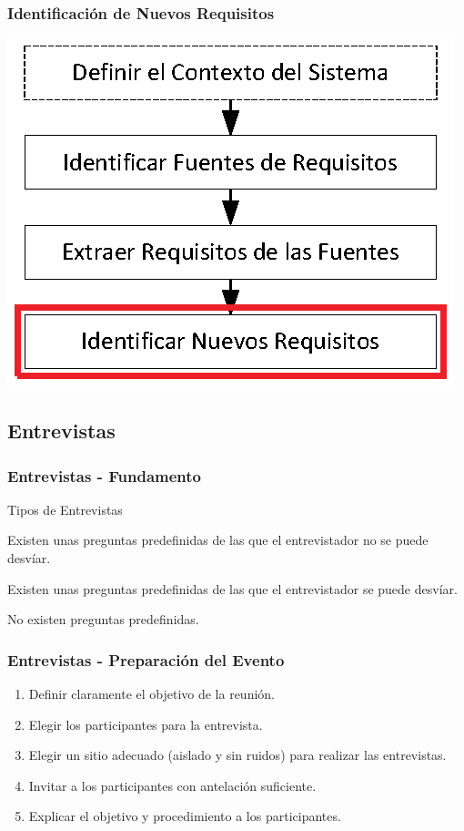 \documentclass[a4paper,t,xcolor=pst,dvips,blue]{beamer}
\begin{document}
\begin{frame}[c]
	\frametitle{Identificación de Nuevos Requisitos}
	\begin{center}
		\includegraphics[width=0.75\linewidth]{images/proceso/requisitosNuevos.eps}
	\end{center}
\end{frame}

\subsection{Entrevistas}

\begin{frame}[t]
    \frametitle{Entrevistas - Fundamento}
    \begin{block}{Tipos de Entrevistas}
        \begin{description}[<+->]
            \item[Estandarizada] Existen unas preguntas predefinidas de las que el entrevistador no se puede desvíar.
            \item[Exploratoria] Existen unas preguntas predefinidas de las que el entrevistador se puede desvíar.
            \item[No estructurada] No existen preguntas predefinidas.
        \end{description}
    \end{block}
\end{frame}

\begin{frame}[c]
    \frametitle{Entrevistas - Preparación del Evento}
    \begin{enumerate}[<+->]
        \item Definir claramente el objetivo de la reunión.
        \item Elegir los participantes para la entrevista.
        \item Elegir un sitio adecuado (aislado y sin ruidos) para realizar las entrevistas.
        \item Invitar a los participantes con antelación suficiente.
        \item Explicar el objetivo y procedimiento a los participantes.
    \end{enumerate}
\end{frame}
\end{document}
